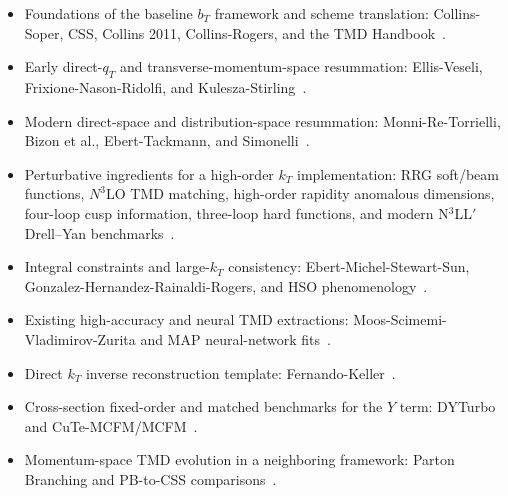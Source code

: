 \documentclass[11pt]{article}
\begin{document}
\begin{itemize}
  \item Foundations of the baseline $b_T$ framework and scheme translation: Collins-Soper, CSS, Collins 2011, Collins-Rogers,
  and the TMD Handbook~\cite{CollinsSoper1981,CSS1985,Collins2011,CollinsRogers2017,TMDHandbook2023}.
  \item Early direct-$q_T$ and transverse-momentum-space resummation: Ellis-Veseli,
  Frixione-Nason-Ridolfi, and Kulesza-Stirling~\cite{EllisVeseli1998,FrixioneNasonRidolfi1999,KuleszaStirling1999,KuleszaStirling2000}.
  \item Modern direct-space and distribution-space resummation: Monni-Re-Torrielli,
  Bizon et al., Ebert-Tackmann, and Simonelli~\cite{MonniReTorrielli2016,BizonMonniReRottoliTorrielli2018,EbertTackmann2017,Simonelli2026}.
  \item Perturbative ingredients for a high-order $k_T$ implementation: RRG soft/beam
  functions, $N^3$LO TMD matching, high-order rapidity anomalous dimensions, four-loop cusp information,
  three-loop hard functions, and modern N$^3$LL$'$ Drell--Yan benchmarks~\cite{LuebbertOredssonStahlhofen2016,EbertMistlbergerVita2020,LuoYangZhuZhu2021,LiZhu2017,MoultZhuZhu2022,DuhrMistlbergerVita2022,HennKorchemskyMistlberger2020,GehrmannGloverHuberIkizlerliStuderus2010,BillisMichelTackmann2025}.
  \item Integral constraints and large-$k_T$ consistency: Ebert-Michel-Stewart-Sun,
  Gonzalez-Hernandez-Rainaldi-Rogers, and HSO phenomenology~\cite{EbertMichelStewartSun2022,GonzalezHernandezRainaldiRogers2023,AslanBoglioneGHRRainaldiRogersSimonelli2024}.
  \item Existing high-accuracy and neural TMD extractions: Moos-Scimemi-Vladimirov-Zurita
  and MAP neural-network fits~\cite{MoosScimemiVladimirovZurita2024,MoosScimemiVladimirovZurita2025,BacchettaEtAl2025NN}.
  \item Direct $k_T$ inverse reconstruction template: Fernando-Keller~\cite{FernandoKeller2026}.
  \item Cross-section fixed-order and matched benchmarks for the $Y$ term: DYTurbo and
  CuTe-MCFM/MCFM~\cite{CamardaEtAlDYTurbo2020,CamardaCieriFerrera2021,NeumannCampbell2023}.
  \item Momentum-space TMD evolution in a neighboring framework: Parton Branching and
  PB-to-CSS comparisons~\cite{BubanjaEtAl2024PB,BermudezMartinez2023PBtoCSS}.
\end{itemize}
\end{document}
